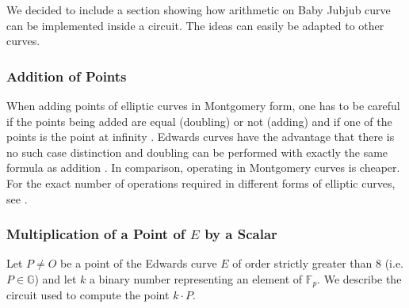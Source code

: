 \documentclass{article}
\newcommand{\Fp}{\ensuremath{\mathbb{F}_p}}
\newcommand{\G}{\ensuremath{\mathbb{G}}}
\theoremstyle{definition}
\theoremstyle{remark}
\begin{document}
\begin{spacing}{1.2}
\begin{multicols}{2}
We decided to include a section showing how arithmetic on Baby Jubjub curve can be implemented inside a circuit. The ideas can easily be adapted to other curves. 


\subsubsection{Addition of Points}		
When adding points of elliptic curves %
in Montgomery form, one has to be careful if the points being added are equal (doubling) or not (adding) and if one of the points is the point at infinity \cite{Okeya:2000:ECM:648117.746614}. Edwards curves have the advantage that there is no such case distinction and doubling can be performed with exactly the same formula as addition \cite{cryptoeprint:2008:013}. In comparison, operating in Montgomery curves is cheaper. For the exact number of operations required in different forms of elliptic curves, see \cite{cryptoeprint:2008:013}.
		 	

\subsubsection{Multiplication of a Point of $E$ by a Scalar}

Let $P\not= O$ be a point of the Edwards curve $E$ of order strictly greater than 8 (i.e. $P\in\G$) and let $k$ a binary number representing an element of $\Fp$. We describe the circuit used to compute the point $k\cdot P$.
	 	

\end{multicols}
\end{spacing}
\end{document}
